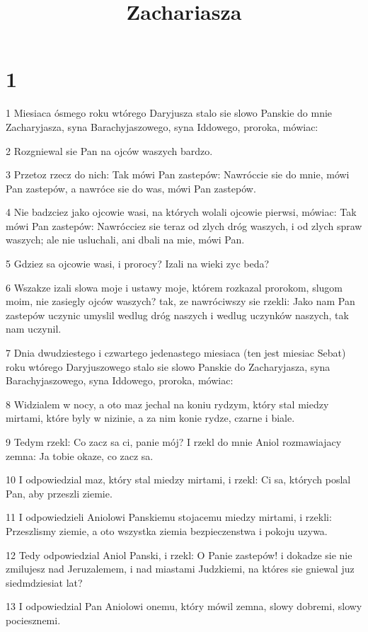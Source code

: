 

\title{Zachariasza}


\chapter{1}

\par 1 Miesiaca ósmego roku wtórego Daryjusza stalo sie slowo Panskie do mnie Zacharyjasza, syna Barachyjaszowego, syna Iddowego, proroka, mówiac:
\par 2 Rozgniewal sie Pan na ojców waszych bardzo.
\par 3 Przetoz rzecz do nich: Tak mówi Pan zastepów: Nawróccie sie do mnie, mówi Pan zastepów, a nawróce sie do was, mówi Pan zastepów.
\par 4 Nie badzciez jako ojcowie wasi, na których wolali ojcowie pierwsi, mówiac: Tak mówi Pan zastepów: Nawrócciez sie teraz od zlych dróg waszych, i od zlych spraw waszych; ale nie usluchali, ani dbali na mie, mówi Pan.
\par 5 Gdziez sa ojcowie wasi, i prorocy? Izali na wieki zyc beda?
\par 6 Wszakze izali slowa moje i ustawy moje, którem rozkazal prorokom, slugom moim, nie zasiegly ojców waszych? tak, ze nawróciwszy sie rzekli: Jako nam Pan zastepów uczynic umyslil wedlug dróg naszych i wedlug uczynków naszych, tak nam uczynil.
\par 7 Dnia dwudziestego i czwartego jedenastego miesiaca (ten jest miesiac Sebat) roku wtórego Daryjuszowego stalo sie slowo Panskie do Zacharyjasza, syna Barachyjaszowego, syna Iddowego, proroka, mówiac:
\par 8 Widzialem w nocy, a oto maz jechal na koniu rydzym, który stal miedzy mirtami, które byly w nizinie, a za nim konie rydze, czarne i biale.
\par 9 Tedym rzekl: Co zacz sa ci, panie mój? I rzekl do mnie Aniol rozmawiajacy zemna: Ja tobie okaze, co zacz sa.
\par 10 I odpowiedzial maz, który stal miedzy mirtami, i rzekl: Ci sa, których poslal Pan, aby przeszli ziemie.
\par 11 I odpowiedzieli Aniolowi Panskiemu stojacemu miedzy mirtami, i rzekli: Przeszlismy ziemie, a oto wszystka ziemia bezpieczenstwa i pokoju uzywa.
\par 12 Tedy odpowiedzial Aniol Panski, i rzekl: O Panie zastepów! i dokadze sie nie zmilujesz nad Jeruzalemem, i nad miastami Judzkiemi, na któres sie gniewal juz siedmdziesiat lat?
\par 13 I odpowiedzial Pan Aniolowi onemu, który mówil zemna, slowy dobremi, slowy pociesznemi.
